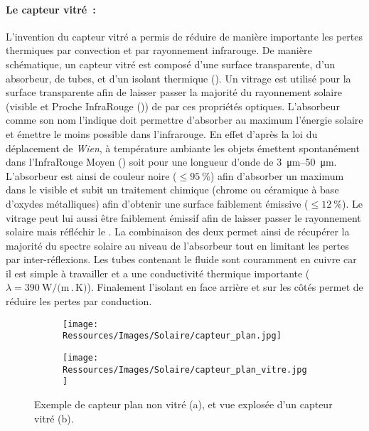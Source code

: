 \paragraph{Le capteur vitré~:} %
\label{par:le_capteur_vitre}
L’invention du capteur vitré a permis de réduire de manière importante les pertes
thermiques par convection et par rayonnement infrarouge. De manière schématique, un
capteur vitré est composé d’une surface transparente, d’un absorbeur, de tubes, et d’un
isolant thermique (). Un vitrage est utilisé pour la
surface transparente afin de laisser passer la majorité du rayonnement solaire (visible et
Proche InfraRouge ()) de par ces propriétés optiques. L’absorbeur comme son nom
l’indique doit permettre d’absorber au maximum l’énergie solaire et émettre le moins possible dans
l’infrarouge. En effet d’après la loi du déplacement de \textit{Wien}, à température
ambiante les objets émettent spontanément dans l’InfraRouge Moyen () soit pour
une longueur d’onde de \SIrange{3}{50}{\micro\metre}. L’absorbeur est ainsi de
couleur noire ($\leq \SI{95}{\percent}$) afin d’absorber un maximum dans le visible et
subit un traitement chimique (chrome ou céramique à base d’oxydes métalliques) afin
d’obtenir une surface faiblement émissive ($\leq \SI{12}{\percent}$). Le vitrage peut lui
aussi être faiblement émissif afin de laisser passer le rayonnement solaire mais réfléchir
le . La combinaison des deux permet ainsi de récupérer la majorité du spectre
solaire au niveau de l’absorbeur tout en limitant les pertes par inter-réflexions. Les
tubes contenant le fluide sont couramment en cuivre car il est simple à travailler et a
une conductivité thermique importante ($\lambda = \SI{390}{\watt\per(\metre\period\kelvin)}$).
Finalement l’isolant en face arrière et sur les côtés permet de réduire les pertes par conduction.

\begin{figure}
    \centering
    \begin{subfigure}[b]{0.4\textwidth}
        \centering
        \texttt{[image: Ressources/Images/Solaire/capteur\_plan.jpg]}
        \caption{}
        \label{fig:capteur_plan}
    \end{subfigure}
    \quad
    \begin{subfigure}[b]{0.5\textwidth}
        \centering
        \texttt{[image: Ressources/Images/Solaire/capteur\_plan\_vitre.jpg]}
        \caption{}
        \label{fig:capteur_plan_vitre}
    \end{subfigure}
    \caption[Description des capteurs plans]
             {Exemple de capteur plan non vitré (a), et vue explosée d’un capteur vitré (b).}
    \label{fig:capteurs_plan}
\end{figure}


